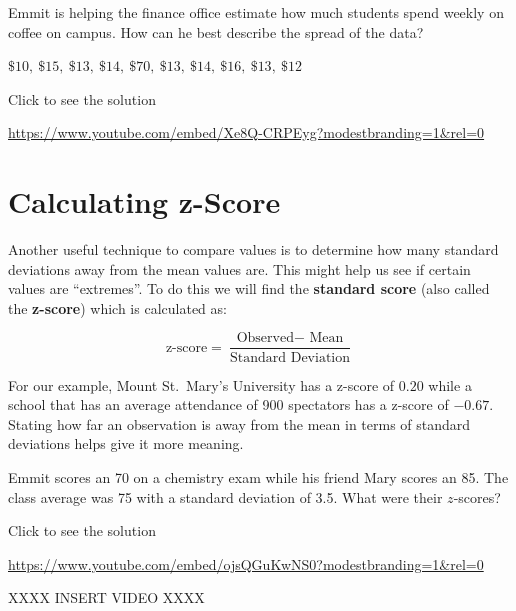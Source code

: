 \documentclass[
  letterpaper,
  DIV=11,
  numbers=noendperiod]{scrreprt}
\begin{document}
\begin{tcolorbox}[enhanced jigsaw, colbacktitle=quarto-callout-tip-color!10!white, breakable, bottomrule=.15mm, colframe=quarto-callout-tip-color-frame, left=2mm, opacitybacktitle=0.6, title=\textcolor{quarto-callout-tip-color}{\faLightbulb}\hspace{0.5em}{Try it Out}, leftrule=.75mm, opacityback=0, rightrule=.15mm, titlerule=0mm, bottomtitle=1mm, colback=white, toprule=.15mm, arc=.35mm, toptitle=1mm, coltitle=black]

Emmit is helping the finance office estimate how much students spend
weekly on coffee on campus. How can he best describe the spread of the
data?

\(\$10,\ \$15,\ \$13,\ \$14,\ \$70,\ \$13,\ \$14,\ \$16,\ \$13,\ \$12\)

Click to see the solution

\url{https://www.youtube.com/embed/Xe8Q-CRPEyg?modestbranding=1&rel=0}

\end{tcolorbox}

\section{Calculating z-Score}\label{calculating-z-score}

Another useful technique to compare values is to determine how many
standard deviations away from the mean values are. This might help us
see if certain values are ``extremes''. To do this we will find the
\textbf{standard score} (also called the \textbf{z-score}) which is
calculated as:

\[
\text{z-score}=\frac{\text{Observed} - \text{ Mean}}{\text{Standard Deviation}}
\]

For our example, Mount St.~Mary's University has a z-score of \(0.20\)
while a school that has an average attendance of 900 spectators has a
z-score of \(-0.67\). Stating how far an observation is away from the
mean in terms of standard deviations helps give it more meaning.

\begin{tcolorbox}[enhanced jigsaw, colbacktitle=quarto-callout-tip-color!10!white, breakable, bottomrule=.15mm, colframe=quarto-callout-tip-color-frame, left=2mm, opacitybacktitle=0.6, title=\textcolor{quarto-callout-tip-color}{\faLightbulb}\hspace{0.5em}{Try it Out}, leftrule=.75mm, opacityback=0, rightrule=.15mm, titlerule=0mm, bottomtitle=1mm, colback=white, toprule=.15mm, arc=.35mm, toptitle=1mm, coltitle=black]

Emmit scores an 70 on a chemistry exam while his friend Mary scores an
85. The class average was 75 with a standard deviation of 3.5. What were
their \(z\)-scores?

Click to see the solution

\url{https://www.youtube.com/embed/ojsQGuKwNS0?modestbranding=1&rel=0}

XXXX INSERT VIDEO XXXX

\end{tcolorbox}
\end{document}

